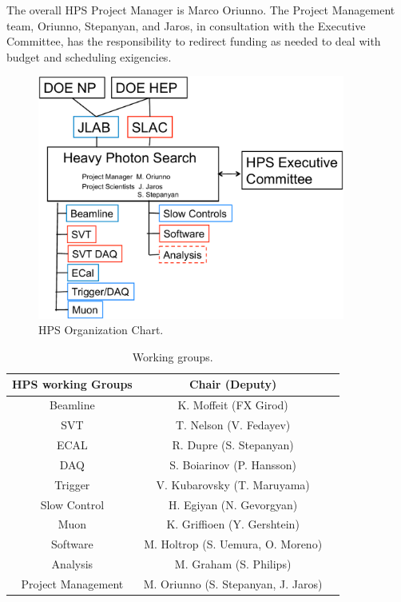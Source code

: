 The overall HPS Project Manager is Marco Oriunno. The Project Management team, Oriunno, Stepanyan, and Jaros,
in consultation with the Executive Committee, has the responsibility to redirect funding as needed to deal with budget and scheduling exigencies.

\begin{figure}[ht]
\centering
\includegraphics[width=0.9\textwidth]{cost_schedule/org_chart} 
\caption{HPS Organization Chart.}
\label{fig:org_chart}
\end{figure}


\begin{table}[htdp]
\caption{Working groups.}
\begin{center}
\begin{tabular}{|c|c|c|}
\hline
HPS working Groups	& Chair (Deputy)\\
\hline\hline
Beamline	&K. Moffeit (FX Girod)\\
\hline
SVT	&T. Nelson (V. Fedayev)\\
\hline
ECAL	& R. Dupre (S. Stepanyan)\\
\hline
DAQ	 & S. Boiarinov (P. Hansson)\\
\hline
Trigger &	V. Kubarovsky (T. Maruyama)\\
\hline
Slow Control	& H. Egiyan (N. Gevorgyan)\\
\hline
Muon &	K. Griffioen (Y. Gershtein)\\
\hline
Software	& M. Holtrop (S. Uemura, O. Moreno)\\
\hline
Analysis &	M. Graham (S. Philips)\\
\hline
Project Management &	M. Oriunno (S. Stepanyan, J. Jaros)\\
\hline
\end{tabular}
\end{center}
\label{tb:groups}
\end{table}%

